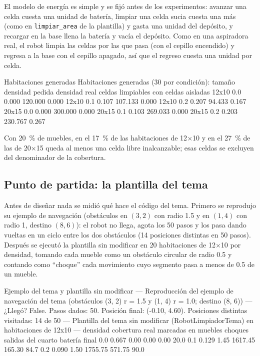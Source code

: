 \documentclass[11pt,letterpaper]{article}
\begin{document}
El modelo de energía es simple y se fijó antes de los experimentos: avanzar una celda cuesta una unidad de batería, limpiar una celda sucia cuesta una más (como en \texttt{limpiar\_area} de la plantilla) y gasta una unidad del depósito, y recargar en la base llena la batería y vacía el depósito. Como en una aspiradora real, el robot limpia las celdas por las que pasa (con el cepillo encendido) y regresa a la base con el cepillo apagado, así que el regreso cuesta una unidad por celda.

\begin{consola}[label=out:hab]{Habitaciones generadas}
Habitaciones generadas (30 por condición):
tamaño  densidad pedida  densidad real  celdas limpiables  con celdas aisladas
 12x10              0.0          0.000            120.000                0.000
 12x10              0.1          0.107            107.133                0.000
 12x10              0.2          0.207             94.433                0.167
 20x15              0.0          0.000            300.000                0.000
 20x15              0.1          0.103            269.033                0.000
 20x15              0.2          0.203            230.767                0.267
\end{consola}

Con 20~\% de muebles, en el 17~\% de las habitaciones de 12$\times$10 y en el 27~\% de las de 20$\times$15 queda al menos una celda libre inalcanzable; esas celdas se excluyen del denominador de la cobertura.

\subsection{Punto de partida: la plantilla del tema}

Antes de diseñar nada se midió qué hace el código del tema. Primero se reprodujo su ejemplo de navegación (obstáculos en $(3, 2)$ con radio 1.5 y en $(1, 4)$ con radio 1, destino $(8, 6)$): el robot no llega, agota los 50 pasos y los pasa dando vueltas en un ciclo entre los dos obstáculos (14 posiciones distintas en 50 pasos). Después se ejecutó la plantilla sin modificar en 20 habitaciones de 12$\times$10 por densidad, tomando cada mueble como un obstáculo circular de radio 0.5 y contando como ``choque'' cada movimiento cuyo segmento pasa a menos de 0.5 de un mueble.

\begin{consola}[label=out:tema]{Ejemplo del tema y plantilla sin modificar}
--- Reproducción del ejemplo de navegación del tema (obstáculos (3, 2) r = 1.5 y (1, 4) r = 1.0; destino (8, 6)) ---
¿Llegó? False. Pasos dados: 50. Posición final: (-0.10, 4.60). Posiciones distintas visitadas: 14 de 50
--- Plantilla del tema sin modificar (RobotLimpiadorTema) en habitaciones de 12x10 ---
 densidad  cobertura real  marcadas en muebles  choques  salidas del cuarto  batería final
      0.0           0.667                 0.00     0.00                0.00           20.0
      0.1           0.129                 1.45  1617.45              165.30           84.7
      0.2           0.090                 1.50  1755.75              571.75           90.0
\end{consola}
\end{document}
